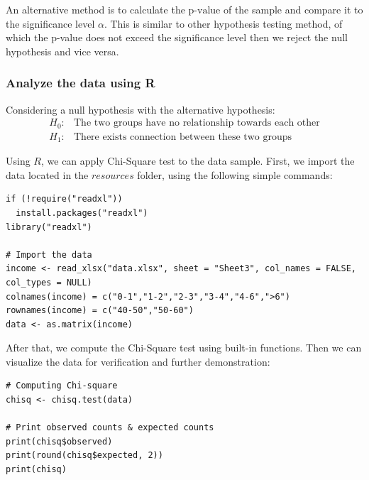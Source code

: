 \documentclass[a4paper]{article}
\numberwithin{equation}{section}
\begin{document}
An alternative method is to calculate the \(\text{p-value}\) of the sample and compare it to the significance level \( \alpha \). This is similar to other hypothesis testing method, of which the p-value does not exceed the significance level then we reject the null hypothesis and vice versa.

\subsubsection{Analyze the data using R}\label{p2:anal}
Considering a null hypothesis with the alternative hypothesis:
\begin{align*}
  H_0: & \text{The two groups have no relationship towards each other} \\
  H_1: & \text{There exists connection between these two groups}
\end{align*}

Using \(R\), we can apply Chi-Square test to the data sample. First, we import the data located in the \(resources\) folder, using the following simple commands:
\begin{mdframed}[leftline=false,rightline=false,backgroundcolor=magenta!10,nobreak=true]
  \begin{verbatim}
if (!require("readxl"))
  install.packages("readxl")
library("readxl")

# Import the data
income <- read_xlsx("data.xlsx", sheet = "Sheet3", col_names = FALSE, col_types = NULL)
colnames(income) = c("0-1","1-2","2-3","3-4","4-6",">6")
rownames(income) = c("40-50","50-60")
data <- as.matrix(income)
  \end{verbatim}
\end{mdframed}

After that, we compute the Chi-Square test using built-in functions. Then we can visualize the data for verification and further demonstration:
\begin{mdframed}[leftline=false,rightline=false,backgroundcolor=magenta!10,nobreak=true]
  \begin{verbatim}
# Computing Chi-square
chisq <- chisq.test(data)

# Print observed counts & expected counts
print(chisq$observed)
print(round(chisq$expected, 2))
print(chisq)
  \end{verbatim}
\end{mdframed}
\end{document}
